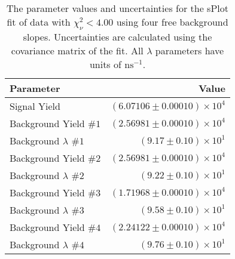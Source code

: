 
\begin{table}[ht]
    \begin{center}
        \begin{tabular}{lr}\toprule
            Parameter & Value \\\midrule
            Signal Yield & $(6.07106 \pm 0.00010) \times 10^{4}$ \\
            Background Yield $\#1$ & $(2.56981 \pm 0.00010) \times 10^{4}$ \\
            Background $\lambda$ $\#1$ & $(9.17 \pm 0.10) \times 10^{1}$ \\
            Background Yield $\#2$ & $(2.56981 \pm 0.00010) \times 10^{4}$ \\
            Background $\lambda$ $\#2$ & $(9.22 \pm 0.10) \times 10^{1}$ \\
            Background Yield $\#3$ & $(1.71968 \pm 0.00010) \times 10^{4}$ \\
            Background $\lambda$ $\#3$ & $(9.58 \pm 0.10) \times 10^{1}$ \\
            Background Yield $\#4$ & $(2.24122 \pm 0.00010) \times 10^{4}$ \\
            Background $\lambda$ $\#4$ & $(9.76 \pm 0.10) \times 10^{1}$ \\\bottomrule
        \end{tabular}
        \caption{The parameter values and uncertainties for the sPlot fit of data with $\chi^2_\nu < 4.00$ using four free background slopes. Uncertainties are calculated using the covariance matrix of the fit. All $\lambda$ parameters have units of $\si{\nano\second}^{-1}$.}\label{tab:splot-fit-results-chisqdof-4.00-free-4}
    \end{center}
\end{table}
